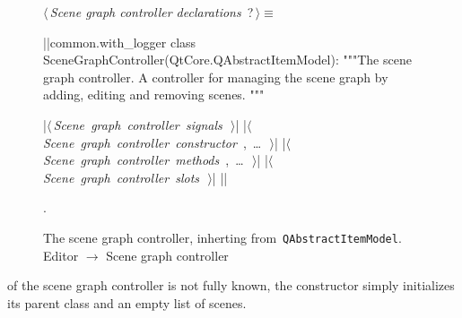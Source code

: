 \documentclass[%
    a4paper,    %
    justified,  %
    nobib,      %
    openany     %
]{tufte-book}
\makeatletter
\renewcommand{\label}[1]{\@tufte@label{##1}}%
\makeatother
\begin{document}
\begin{figure}
\begin{flushleft} \small
\begin{minipage}{\linewidth}\label{scrap25}\raggedright\small
{} $\langle\,${\itshape Scene graph controller declarations}\nobreak\ {\footnotesize {?}}$\,\rangle\equiv$
\vspace{-1ex}
\begin{pythoncode}
|\normalfont{}\fontfamily{}|common.with_logger
class SceneGraphController(QtCore.QAbstractItemModel):
    """The scene graph controller.
    A controller for managing the scene graph by adding,
    editing and removing scenes.
    """

    |\hbox{$\langle\,${\itshape Scene graph controller signals}\nobreak\ {\footnotesize {}}$\,\rangle$}|
    |\hbox{$\langle\,${\itshape Scene graph controller constructor}\nobreak\ {\footnotesize {}, \ldots\ }$\,\rangle$}|
    |\hbox{$\langle\,${\itshape Scene graph controller methods}\nobreak\ {\footnotesize {}, \ldots\ }$\,\rangle$}|
    |\hbox{$\langle\,${\itshape Scene graph controller slots}\nobreak\ {\footnotesize {}}$\,\rangle$}|
|\NWsep|
\end{pythoncode}
\vspace{1.5ex}
\footnotesize
\begin{list}{}{\setlength{\itemsep}{-\parsep}\setlength{\itemindent}{-\leftmargin}}
\item {\NWtxtMacroNoRef}.

\item{}
\end{list}
\end{minipage}\vspace{4ex}
\end{flushleft}
\caption{The scene graph controller, inherting from~\texttt{QAbstractItemModel}.
  \newline{}\newline{}Editor $\rightarrow$ Scene graph controller}
\label{editor:lst:scene-graph-controller}
\end{figure}

 of the scene graph controller is
not fully known, the constructor simply initializes its parent class and an
empty list of scenes.
\end{document}
